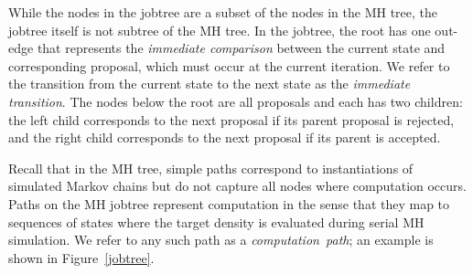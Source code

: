 \documentclass[angelino.tex]{subfiles}
\begin{document}
While the nodes in the jobtree are a subset of the nodes in the MH tree,
the jobtree itself is not subtree of the MH tree.
In the jobtree, the root has one out-edge that represents the
\emph{immediate comparison} between the current state and
corresponding proposal, which must occur at the current iteration.
We refer to the transition from the current state to the next state as the
\emph{immediate transition}.
The nodes below the root are all proposals and each has two children: the
left child corresponds to the next proposal if its parent proposal is rejected,
and the right child corresponds to the next proposal if its parent is accepted.

Recall that in the MH tree, simple paths correspond to instantiations of
simulated Markov chains but do not capture all nodes where computation occurs.
Paths on the MH jobtree represent computation in the sense that they map to
sequences of states where the target density is evaluated during serial MH 
simulation.
We refer to any such path as a \emph{computation~path};
an example is shown in Figure~\ref{jobtree}.

\end{document}
